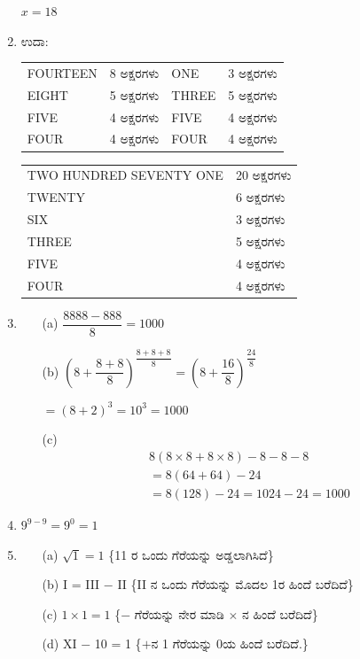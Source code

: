 \begin{enumerate}
\vskip 0.1cm
$x = 18$

\item ಉದಾ: 

\begin{tabular}[t]{llll}
FOURTEEN & 8 ಅಕ್ಷರಗಳು & ONE & 3 ಅಕ್ಷರಗಳು\\
EIGHT & 5 ಅಕ್ಷರಗಳು  & THREE & 5 ಅಕ್ಷರಗಳು\\
FIVE & 4 ಅಕ್ಷರಗಳು  & FIVE & 4 ಅಕ್ಷರಗಳು\\
FOUR & 4 ಅಕ್ಷರಗಳು  & FOUR & 4 ಅಕ್ಷರಗಳು
\end{tabular}

\vskip 0.2cm

\begin{tabular}[t]{ll}
TWO HUNDRED SEVENTY ONE & 20 ಅಕ್ಷರಗಳು\\
TWENTY & 6 ಅಕ್ಷರಗಳು\\
SIX & 3 ಅಕ್ಷರಗಳು\\
THREE & 5 ಅಕ್ಷರಗಳು\\
FIVE & 4 ಅಕ್ಷರಗಳು\\
FOUR & 4 ಅಕ್ಷರಗಳು
\end{tabular}

\smallskip
\item 
\begin{itemize}
\item[(a)] $\dfrac{8888 - 888}{8} = 1000$
\item[(b)] $\left(8 + \dfrac{8 + 8}{8}\right)^{\dfrac{8+8+8}{8}} = \left(8 + \dfrac{16}{8}\right)^{\dfrac{24}{8}}$

\smallskip

$= (8 + 2)^{3} = 10^{3} = 1000$
\item[(c)] 
\begin{align*}
& 8(8\times 8 + 8\times 8) - 8 - 8 - 8\\
& = 8(64 + 64) - 24\\
& = 8(128) - 24 = 1024 - 24 = 1000
\end{align*}
\end{itemize}

\item $9^{9-9} = 9^{0} = 1$

\item 
\begin{itemize}
\item[(a)] $\sqrt{1} = 1$ \{11 ರ ಒಂದು ಗೆರೆಯನ್ನು ಅಡ್ಡಲಾಗಿಸಿದೆ\}
\item[(b)] I = III $-$ II \{II ನ ಒಂದು ಗೆರೆಯನ್ನು ಮೊದಲ 1ರ ಹಿಂದೆ ಬರೆದಿದೆ\}
\item[(c)] $1\times 1 = 1$ \{$-$ ಗೆರೆಯನ್ನು ನೇರ ಮಾಡಿ $\times$ ನ ಹಿಂದೆ ಬರೆದಿದೆ\}
\item[(d)] XI $-$ 10 = 1 \{$+$ನ 1 ಗೆರೆಯನ್ನು 0ಯ ಹಿಂದೆ ಬರೆದಿದೆ.\}
\end{itemize}


\end{enumerate}
